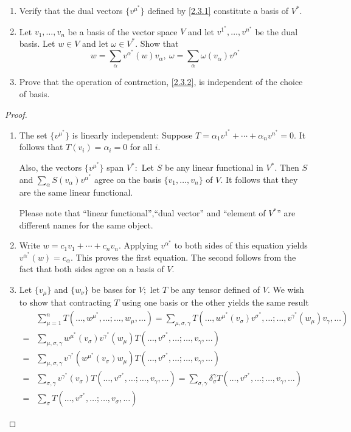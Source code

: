 \begin{problem}\leavevmode
\begin{enumerate}[label=(\alph*)]
    \item Verify that the dual vectors $\{v^{\mu^*}\}$ defined by \eqref{2.3.1} constitute a basis of $V^*$.
    \item Let $v_1,\ldots,v_n$ be a basis of the vector space $V$ and let $v^{1^*},\ldots,v^{n^*}$ be the dual basis. Let $w\in V$ and let $\omega\in V^*$. Show that
    \[w=\sum_\alpha v^{\alpha^*}(w)v_\alpha,\ \omega=\sum_\alpha\omega(v_\alpha)v^{\alpha^*}\]
    \item Prove that the operation of contraction, \eqref{2.3.2}, is independent of the choice of basis.
\end{enumerate}
\end{problem}
\begin{proof}\leavevmode
\begin{enumerate}[label=(\alph*)]
    \item The set $\{v^{\mu^*}\}$ is linearly independent: Suppose $T=\alpha_1v^{1^*}+\cdots+\alpha_nv^{n^*}=0.$ It follows that $T(v_i) = \alpha_i= 0$ for all $i.$

    Also, the vectors $\{v^{\mu^*}\}$ span $V^*:$ Let $S$ be any linear functional in $V^*.$ Then $S$ and $\sum_{\alpha}S(v_{\alpha})v^{\alpha^*}$ agree on the basis $\{ v_1, \ldots , v_n\} $ of $V$. It follows that they are the same linear functional.

    Please note that ``linear functional'',``dual vector'' and ``element of $V^*$'' are different names for the same object.
    \item Write $w=c_1v_1+\cdots+c_nv_n.$ Applying $v^{\alpha^*}$ to both sides of this equation yields $v^{\alpha^*}(w)=c_\alpha.$ This proves the first equation. The second follows from the fact that both sides agree on a basis of $V$.
    \item Let $\{ v_\mu\} $ and $\{ w_\nu\} $ be bases for $V;$ let $T$ be any tensor defined of $V$. We wish to show that contracting $T$ using one basis or the other yields the same result
    \[\begin{aligned}
        &\sum_{\mu=1}^nT(\ldots,w^{\mu^*},\ldots;\ldots,w_\mu,\ldots)=\sum_{\mu,\sigma,\gamma}T(\ldots,w^{\mu^*}(v_\sigma)v^{\sigma^*},\ldots;\ldots,v^{\gamma^*}(w_\mu)v_\gamma,\ldots)\\
        =&\sum_{\mu,\sigma,\gamma}w^{\mu^*}(v_\sigma)v^{\gamma^*}(w_\mu)T(\ldots,v^{\sigma^*},\ldots;\ldots,v_\gamma,\ldots)\\
        =&\sum_{\mu,\sigma,\gamma}v^{\gamma^*}(w^{\mu^*}(v_\sigma)w_\mu)T(\ldots,v^{\sigma^*},\ldots;\ldots,v_\gamma,\ldots)\\
        =&\sum_{\sigma,\gamma}v^{\gamma^*}(v_\sigma)T(\ldots,v^{\sigma^*},\ldots;\ldots,v_\gamma,\ldots)=\sum_{\sigma,\gamma}\delta^\gamma_\sigma T(\ldots,v^{\sigma^*},\ldots;\ldots,v_\gamma,\ldots)\\
        =&\sum_\sigma T(\ldots,v^{\sigma^*},\ldots;\ldots,v_\sigma,\ldots)
    \end{aligned}\]
\end{enumerate}
\end{proof}

